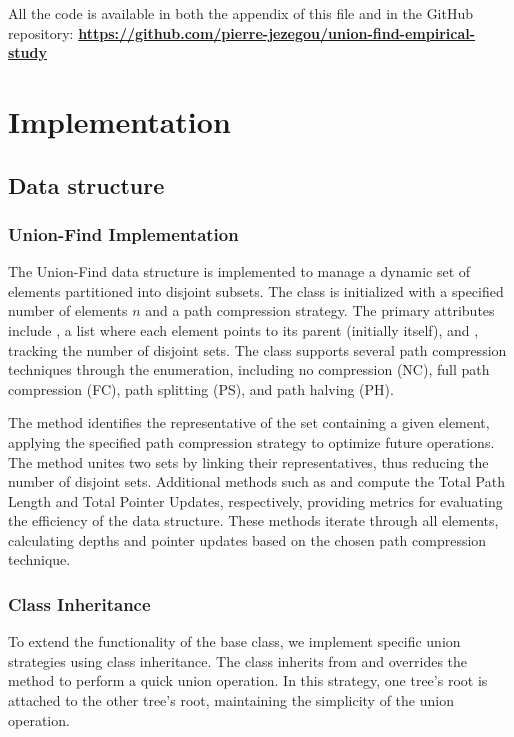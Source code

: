 \documentclass[10pt,a4paper,hidelinks]{article}
\begin{document}
All the code is available in both the appendix of this file and in the GitHub repository: \textbf{\url{https://github.com/pierre-jezegou/union-find-empirical-study}}

\section{Implementation}
\subsection{Data structure}
\subsubsection{Union-Find Implementation}
The Union-Find data structure is implemented to manage a dynamic set of elements partitioned into disjoint subsets. The class  is initialized with a specified number of elements $n$ and a path compression strategy. The primary attributes include , a list where each element points to its parent (initially itself), and , tracking the number of disjoint sets. The class supports several path compression techniques through the  enumeration, including no compression (NC), full path compression (FC), path splitting (PS), and path halving (PH).

The  method identifies the representative of the set containing a given element, applying the specified path compression strategy to optimize future operations. The  method unites two sets by linking their representatives, thus reducing the number of disjoint sets. Additional methods such as  and  compute the Total Path Length and Total Pointer Updates, respectively, providing metrics for evaluating the efficiency of the data structure. These methods iterate through all elements, calculating depths and pointer updates based on the chosen path compression technique.

\subsubsection{Class Inheritance}
To extend the functionality of the base  class, we implement specific union strategies using class inheritance. The  class inherits from  and overrides the  method to perform a quick union operation. In this strategy, one tree's root is attached to the other tree's root, maintaining the simplicity of the union operation.
\end{document}
